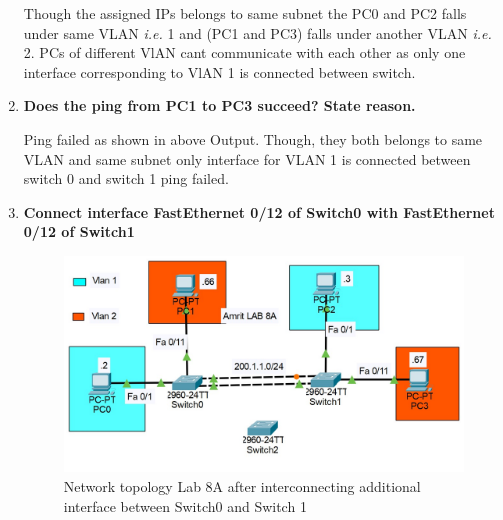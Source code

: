 \documentclass[a4paper,11pt]{article}
\begin{document}
\begin{enumerate}







          Though the assigned IPs belongs to same subnet the  PC0 and PC2 falls under same VLAN \textit{i.e.} 1 and (PC1 and PC3) falls under another  VLAN \textit{i.e.} 2. PCs of different VlAN cant communicate with each other as only one interface corresponding to VlAN 1 is connected between switch.


    \item\textbf{ Does the ping from PC1 to PC3 succeed? State reason.}

          Ping failed as shown in above Output. Though, they both belongs to same VLAN and same subnet only interface for VLAN 1 is connected between switch 0 and switch 1 ping failed.


    \item\textbf{ Connect interface FastEthernet 0/12 of Switch0 with FastEthernet 0/12 of Switch1}


          \begin{figure}[H]
              \centering
              \includegraphics[scale=0.68,cframe=blue 0.5pt 3pt]{./FIG/Lab8A7.jpg}
              \caption{Network topology Lab 8A after interconnecting additional interface between Switch0  and Switch 1 }
          \end{figure}





\end{enumerate}
\end{document}
